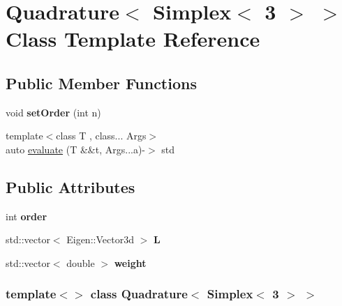 \hypertarget{class_quadrature_3_01_simplex_3_013_01_4_01_4}{
\section{Quadrature$<$ Simplex$<$ 3 $>$ $>$ Class Template Reference}
\label{class_quadrature_3_01_simplex_3_013_01_4_01_4}
}
\subsection*{Public Member Functions}
\begin{DoxyCompactItemize}
\item 
\hypertarget{class_quadrature_3_01_simplex_3_013_01_4_01_4_a663a3b10af98bb78e2dea9cf0717be21}{
void {\bfseries setOrder} (int n)}
\label{class_quadrature_3_01_simplex_3_013_01_4_01_4_a663a3b10af98bb78e2dea9cf0717be21}

\item 
{\footnotesize template$<$class T , class... Args$>$ }\\auto \hyperlink{class_quadrature_3_01_simplex_3_013_01_4_01_4_a71278a0b4d41afa77d7dfa0da71364a3}{evaluate} (T \&\&t, Args...a)-\/$>$ std
\end{DoxyCompactItemize}
\subsection*{Public Attributes}
\begin{DoxyCompactItemize}
\item 
\hypertarget{class_quadrature_3_01_simplex_3_013_01_4_01_4_a0877c6d3679e7903612706f1c56cfd14}{
int {\bfseries order}}
\label{class_quadrature_3_01_simplex_3_013_01_4_01_4_a0877c6d3679e7903612706f1c56cfd14}

\item 
\hypertarget{class_quadrature_3_01_simplex_3_013_01_4_01_4_a789cab3a45959d271a6dd31248862cbd}{
std::vector$<$ Eigen::Vector3d $>$ {\bfseries L}}
\label{class_quadrature_3_01_simplex_3_013_01_4_01_4_a789cab3a45959d271a6dd31248862cbd}

\item 
\hypertarget{class_quadrature_3_01_simplex_3_013_01_4_01_4_a2b9ad843434caf159d08ab1cc4cb1956}{
std::vector$<$ double $>$ {\bfseries weight}}
\label{class_quadrature_3_01_simplex_3_013_01_4_01_4_a2b9ad843434caf159d08ab1cc4cb1956}

\end{DoxyCompactItemize}
\subsubsection*{template$<$$>$ class Quadrature$<$ Simplex$<$ 3 $>$ $>$}



